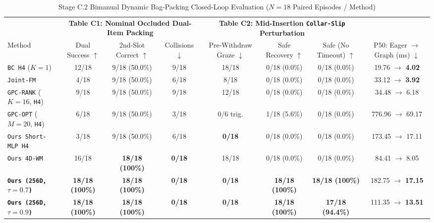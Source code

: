 \documentclass[letterpaper, 10pt, conference]{ieeeconf}
\begin{document}
\begin{table}[t]
\centering
\caption{Stage C.2 Bimanual Dynamic Bag-Packing Closed-Loop Evaluation ($N=18$ Paired Episodes / Method)}
\label{tab:bag_main}
\begin{tabular}{lccccccc}
\toprule
& \multicolumn{3}{c}{\textbf{Table C1: Nominal Occluded Dual-Item Packing}} & \multicolumn{3}{c}{\textbf{Table C2: Mid-Insertion \texttt{Collar-Slip} Perturbation}} & \\
\cmidrule(lr){2-4} \cmidrule(lr){5-7}
Method & Dual Success $\uparrow$ & 2nd-Slot Correct $\uparrow$ & Collisions $\downarrow$ & Pre-Withdraw Graze $\downarrow$ & Safe Recovery $\uparrow$ & Safe (No Timeout) $\uparrow$ & P50: Eager $\to$ Graph (ms) $\downarrow$ \\
\midrule
\texttt{BC H4} ($K=1$) & 12/18 & 9/18 (50.0\%) & 9/18 & 18/18 & 0/18 (0.0\%) & 0/18 (0.0\%) & 19.76 $\to$ \textbf{4.02} \\
\texttt{Joint-FM} & 4/18 & 9/18 (50.0\%) & 6/18 & 8/18 & 0/18 (0.0\%) & 0/18 (0.0\%) & 33.12 $\to$ \textbf{3.92} \\
\texttt{GPC-RANK} ($K=16$, \texttt{H4}) & 9/18 & 9/18 (50.0\%) & 9/18 & 12/18 & 0/18 (0.0\%) & 0/18 (0.0\%) & 34.48 $\to$ 6.18 \\
\texttt{GPC-OPT} ($M=20$, \texttt{H4}) & 6/18 & 9/18 (50.0\%) & 3/18 & 0/6 trig. & 1/18 (5.6\%) & 0/18 (0.0\%) & 776.96 $\to$ 69.17 \\
\texttt{Ours Short-MLP H4} & 3/18 & 9/18 (50.0\%) & 6/18 & \textbf{0/18} & 0/18 (0.0\%) & 0/18 (0.0\%) & 173.45 $\to$ 17.11 \\
\texttt{Ours 4D-WM} & 16/18 & \textbf{18/18 (100\%)} & \textbf{0/18} & 18/18 & 0/18 (0.0\%) & 0/18 (0.0\%) & 84.41 $\to$ 8.05 \\
\textbf{\texttt{Ours (256D, $\tau=0.7$)}} & \textbf{18/18 (100\%)} & \textbf{18/18 (100\%)} & \textbf{0/18} & \textbf{0/18} & \textbf{18/18 (100\%)} & \textbf{18/18 (100\%)} & 182.75 $\to$ \textbf{17.15} \\
\textbf{\texttt{Ours (256D, $\tau=0.9$)}} & \textbf{18/18 (100\%)} & \textbf{18/18 (100\%)} & \textbf{0/18} & \textbf{0/18} & \textbf{18/18 (100\%)} & \textbf{17/18 (94.4\%)} & 111.35 $\to$ \textbf{13.51} \\
\bottomrule
\end{tabular}
\end{table}
\end{document}
